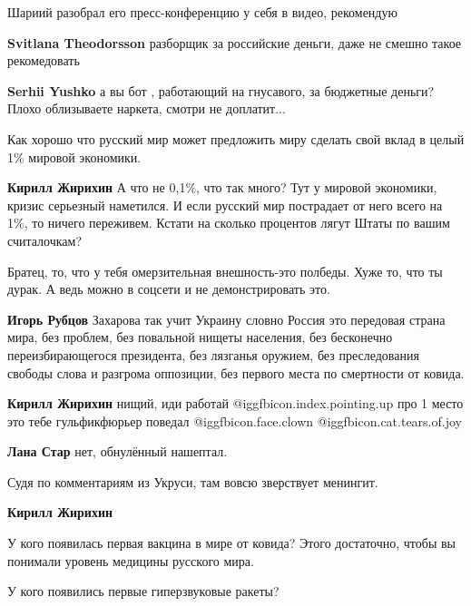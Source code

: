 \begin{itemize}
\begin{itemize}
\end{itemize} %

Шариий разобрал его пресс-конференцию у себя в видео, рекомендую

\begin{itemize} %
\textbf{Svitlana Theodorsson} разборщик за российские деньги, даже не смешно такое рекомедовать

\textbf{Serhii Yushko} а вы бот , работающий на гнусавого, за бюджетные деньги? Плохо облизываете наркета, смотри не доплатит...
\end{itemize} %


Как хорошо что русский мир может предложить миру сделать свой вклад в целый 1\%
мировой экономики.

\begin{itemize} %
\textbf{Кирилл Жирихин}
А что не 0,1\%, что так много?
Тут у мировой экономики, кризис серьезный наметился. И если русский мир пострадает от него всего на 1\%, то ничего переживем.
Кстати на сколько процентов лягут Штаты по вашим считалочкам?

Братец, то, что у тебя омерзительная внешность-это полбеды. Хуже то, что ты дурак. А ведь можно в соцсети и не демонстрировать это.

\textbf{Игорь Рубцов} Захарова так учит Украину словно Россия это передовая страна мира, без проблем, без повальной нищеты населения, без бесконечно переизбирающегося президента, без лязганья оружием, без преследования свободы слова и разгрома оппозиции, без первого места по смертности от ковида.

\textbf{Кирилл Жирихин} нищий, иди работай @igg{fbicon.index.pointing.up} про 1 место это тебе гульфикфюрьер поведал  @igg{fbicon.face.clown}  @igg{fbicon.cat.tears.of.joy} 

\textbf{Лана Стар} нет, обнулённый нашептал.

Судя по комментариям из Укруси, там вовсю зверствует менингит.

\textbf{Кирилл Жирихин}

У кого появилась первая вакцина в мире от ковида? Этого достаточно, чтобы вы понимали уровень медицины русского мира.

У кого появились первые гиперзвуковые ракеты?


\end{itemize}
\end{itemize}
